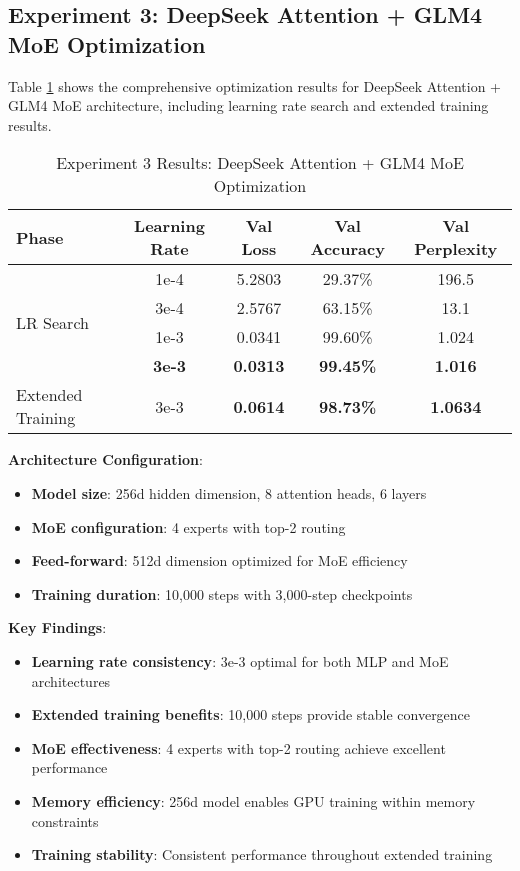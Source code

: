 \documentclass[11pt,a4paper]{article}
\begin{document}
\subsection{Experiment 3: DeepSeek Attention + GLM4 MoE Optimization}

Table \ref{tab:exp3_results} shows the comprehensive optimization results for DeepSeek Attention + GLM4 MoE architecture, including learning rate search and extended training results.

\begin{table}[H]
\centering
\caption{Experiment 3 Results: DeepSeek Attention + GLM4 MoE Optimization}
\label{tab:exp3_results}
\begin{tabular}{@{}lcccc@{}}
\toprule
Phase & Learning Rate & Val Loss & Val Accuracy & Val Perplexity \\
\midrule
\multirow{4}{*}{LR Search} & 1e-4 & 5.2803 & 29.37\% & 196.5 \\
& 3e-4 & 2.5767 & 63.15\% & 13.1 \\
& 1e-3 & 0.0341 & 99.60\% & 1.024 \\
& \textbf{3e-3} & \textbf{0.0313} & \textbf{99.45\%} & \textbf{1.016} \\
\midrule
Extended Training & 3e-3 & \textbf{0.0614} & \textbf{98.73\%} & \textbf{1.0634} \\
\bottomrule
\end{tabular}
\end{table}

\textbf{Architecture Configuration}:
\begin{itemize}
    \item \textbf{Model size}: 256d hidden dimension, 8 attention heads, 6 layers
    \item \textbf{MoE configuration}: 4 experts with top-2 routing
    \item \textbf{Feed-forward}: 512d dimension optimized for MoE efficiency
    \item \textbf{Training duration}: 10,000 steps with 3,000-step checkpoints
\end{itemize}

\textbf{Key Findings}:
\begin{itemize}
    \item \textbf{Learning rate consistency}: 3e-3 optimal for both MLP and MoE architectures
    \item \textbf{Extended training benefits}: 10,000 steps provide stable convergence
    \item \textbf{MoE effectiveness}: 4 experts with top-2 routing achieve excellent performance
    \item \textbf{Memory efficiency}: 256d model enables GPU training within memory constraints
    \item \textbf{Training stability}: Consistent performance throughout extended training
\end{itemize}
\end{document}

